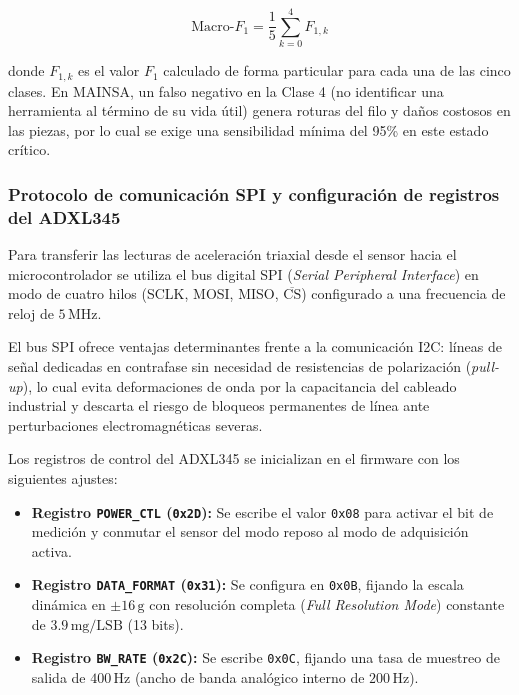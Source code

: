 \begin{equation}
\text{Macro-}F_1 = \frac{1}{5} \sum_{k=0}^{4} F_{1,k}
\label{eq:macro_f1}
\end{equation}

donde $F_{1,k}$ es el valor $F_1$ calculado de forma particular para cada una de las cinco clases. En MAINSA, un falso negativo en la Clase 4 (no identificar una herramienta al término de su vida útil) genera roturas del filo y daños costosos en las piezas, por lo cual se exige una sensibilidad mínima del 95\% en este estado crítico.

\subsubsection{Protocolo de comunicación SPI y configuración de registros del ADXL345}

Para transferir las lecturas de aceleración triaxial desde el sensor hacia el microcontrolador se utiliza el bus digital SPI (\textit{Serial Peripheral Interface}) en modo de cuatro hilos (SCLK, MOSI, MISO, $\overline{\text{CS}}$) configurado a una frecuencia de reloj de $5\,\text{MHz}$.

El bus SPI ofrece ventajas determinantes frente a la comunicación I2C: líneas de señal dedicadas en contrafase sin necesidad de resistencias de polarización (\textit{pull-up}), lo cual evita deformaciones de onda por la capacitancia del cableado industrial y descarta el riesgo de bloqueos permanentes de línea ante perturbaciones electromagnéticas severas.

Los registros de control del ADXL345 se inicializan en el firmware con los siguientes ajustes:
\begin{itemize}
    \item \textbf{Registro \texttt{POWER\_CTL} (\texttt{0x2D}):} Se escribe el valor \texttt{0x08} para activar el bit de medición y conmutar el sensor del modo reposo al modo de adquisición activa.
    \item \textbf{Registro \texttt{DATA\_FORMAT} (\texttt{0x31}):} Se configura en \texttt{0x0B}, fijando la escala dinámica en $\pm 16\,\text{g}$ con resolución completa (\textit{Full Resolution Mode}) constante de $3.9\,\text{mg/LSB}$ (13 bits).
    \item \textbf{Registro \texttt{BW\_RATE} (\texttt{0x2C}):} Se escribe \texttt{0x0C}, fijando una tasa de muestreo de salida de $400\,\text{Hz}$ (ancho de banda analógico interno de $200\,\text{Hz}$).
\end{itemize}

